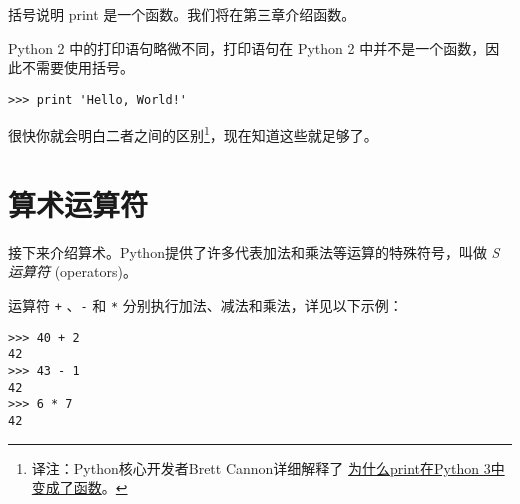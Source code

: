 
括号说明 print 是一个函数。我们将在第三章介绍函数。
 
 


Python 2 中的打印语句略微不同，打印语句在 Python 2 中并不是一个函数，因此不需要使用括号。

\begin{lstlisting}
>>> print 'Hello, World!'
\end{lstlisting}

%

很快你就会明白二者之间的区别\footnote{译注：Python核心开发者Brett Cannon详细解释了 \href{http://codingpy.com/article/why-print-became-a-function-in-python-3/}{为什么print在Python 3中变成了函数}。}，现在知道这些就足够了。

\section{算术运算符}
  
  


接下来介绍算术。Python提供了许多代表加法和乘法等运算的特殊符号，叫做 {\em S运算符} (operators)。


运算符 \lstinline{+} 、\lstinline{-} 和 \lstinline{*} 分别执行加法、减法和乘法，详见以下示例：

\begin{lstlisting}
>>> 40 + 2
42
>>> 43 - 1
42
>>> 6 * 7
42
\end{lstlisting}


